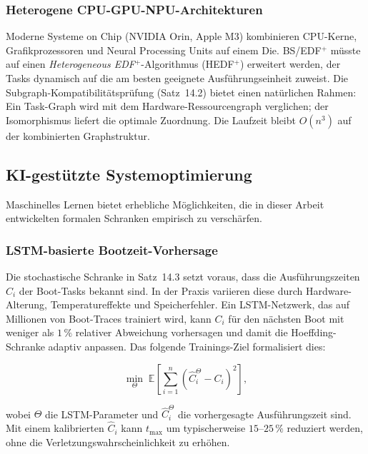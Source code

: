 ﻿\documentclass[a4paper,12pt]{scrreprt}
\theoremstyle{definition}
\begin{document}
	\subsubsection{Heterogene CPU-GPU-NPU-Architekturen}
	
	Moderne Systeme on Chip (NVIDIA Orin, Apple M3) kombinieren CPU-Kerne,
	Grafik\-prozessoren und Neural Processing Units auf einem Die.
	BS/EDF$^+$ müsste auf einen \emph{Heterogeneous EDF$^+$}-Algorithmus
	(HEDF$^+$) erweitert werden, der Tasks dynamisch auf die am besten
	geeignete Ausführungseinheit zuweist. Die Subgraph-Kompatibilitätsprüfung
	(Satz~14.2) bietet einen natürlichen Rahmen: Ein Task-Graph wird mit
	dem Hardware-Ressourcengraph verglichen; der Isomorphismus liefert
	die optimale Zuordnung. Die Laufzeit bleibt $O(n^3)$ auf der
	kombinierten Graphstruktur.
	
	\subsection{KI-gestützte Systemoptimierung}
	
	Maschinelles Lernen bietet erhebliche Möglichkeiten, die in dieser Arbeit
	entwickelten formalen Schranken empirisch zu verschärfen.
	
	\subsubsection{LSTM-basierte Bootzeit-Vorhersage}
	
	Die stochastische Schranke in Satz~14.3 setzt voraus, dass die
	Ausführungszeiten $C_i$ der Boot-Tasks bekannt sind. In der Praxis
	variieren diese durch Hardware-Alterung, Temperatureffekte und
	Speicherfehler. Ein LSTM-Netzwerk, das auf Millionen von Boot-Traces
	trainiert wird, kann $C_i$ für den nächsten Boot mit weniger als
	$1\,\%$ relativer Abweichung vorhersagen und damit die Hoeffding-Schranke
	adaptiv anpassen. Das folgende Trainings-Ziel formalisiert dies:
	
	\[
	\min_{\Theta}\; \mathbb{E}\!\left[\sum_{i=1}^{n}
	\left(\hat{C}_i^{\Theta} - C_i\right)^2\right],
	\]
	
	wobei $\Theta$ die LSTM-Parameter und $\hat{C}_i^{\Theta}$ die vorhergesagte
	Ausführungszeit sind. Mit einem kalibrierten $\hat{C}_i$ kann
	$t_{\max}$ um typischerweise $15$--$25\,\%$ reduziert werden, ohne die
	Verletzungswahrscheinlichkeit zu erhöhen.
	
\end{document}
